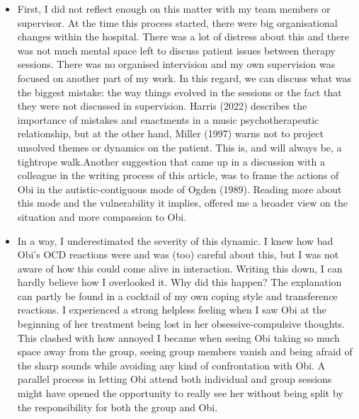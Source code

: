 \documentclass[authordate, empirical]{jote-new-article}
\begin{document}
\begin{itemize}


  \item First, I did not reflect enough on this matter with my team members or supervisor. At the time this process started, there were big organisational changes within the hospital. There was a lot of distress about this and there was not much mental space left to discuss patient issues between therapy sessions. There was no organised intervision and my own supervision was focused on another part of my work. In this regard, we can discuss what was the biggest mistake: the way things evolved in the sessions or the fact that they were not discussed in supervision. Harris (2022) describes the importance of mistakes and enactments in a music psychotherapeutic relationship, but at the other hand, Miller (1997) warns not to project unsolved themes or dynamics on the patient. This is, and will always be, a tightrope walk.Another suggestion that came up in a discussion with a colleague in the writing process of this article, was to frame the actions of Obi in the autistic-contiguous mode of Ogden (1989). Reading more about this mode and the vulnerability it implies, offered me a broader view on the situation and more compassion to Obi.



  \item
        In a way, I underestimated the severity of this dynamic. I knew how bad Obi's OCD reactions were and was (too) careful about this, but I was not aware of how this could come alive in interaction. Writing this down, I can hardly believe how I overlooked it. Why did this happen? The explanation can partly be found in a cocktail of my own coping style and transference reactions. I experienced a strong helpless feeling when I saw Obi at the beginning of her treatment being lost in her obsessive-compulsive thoughts. This clashed with how annoyed I became when seeing Obi taking so much space away from the group, seeing group members vanish and being afraid of the sharp sounds while avoiding any kind of confrontation with Obi. A parallel process in letting Obi attend both individual and group sessions might have opened the opportunity to really see her without being split by the responsibility for both the group and Obi.




\end{itemize}
\end{document}
